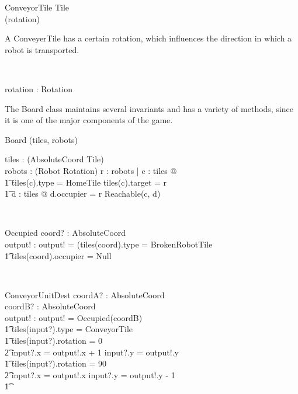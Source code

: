 \begin{class}{ConveyorTile}
Tile \\
\upharpoonright (rotation) \\
\begin{classcom}
A ConveyerTile has a certain rotation, which influences the direction in which a robot is transported.
\end{classcom} \\
\begin{state}
rotation : Rotation
\end{state}
\end{class}

The Board class maintains several invariants and has a variety of methods, since it is one of the major components of the game.

\begin{class}{Board}
\upharpoonright (tiles, robots) \\
\begin{state}
tiles : \power (AbsoluteCoord \fun Tile) \\
robots : \power (Robot \fun Rotation)
\where
\forall r : robots | \exists c : \dom tiles @  \\ \t1 tiles(c).type = HomeTile \wedge tiles(c).target = r \wedge \\ \t1
\exists d : \dom tiles @ d.occupier = r \wedge Reachable(c, d)
\end{state} \\
\begin{schema}{Occupied}
coord? : AbsoluteCoord \\
output! : \bool
\where
output! = (tiles(coord).type = BrokenRobotTile \; \; \vee \\ \t1
tiles(coord).occupier \not = Null
\end{schema} \\
\begin{schema}{ConveyorUnitDest}
coordA? : AbsoluteCoord \\
coordB? : AbsoluteCoord \\
output! : \bool
\where
output! = \neg Occupied(coordB) \\ \t1
        tiles(input?).type = ConveyorTile \\ \t1
        tiles(input?).rotation = 0 \Rightarrow \\ \t2 input?.x = output!.x + 1 \wedge input?.y = output!.y \\ \t1
        tiles(input?).rotation = 90 \Rightarrow \\ \t2 input?.x = output!.x \wedge input?.y = output!.y - 1 \\ \t1

\end{schema}
\end{class}
